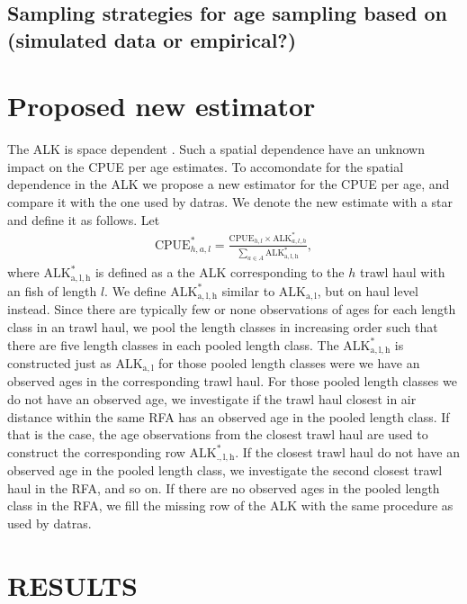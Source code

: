 \documentclass[a4paper 12pt]{article}
\numberwithin{equation}{section}
\begin{document}
\subsection{Sampling strategies for age sampling based on (simulated data or empirical?)}


\section{Proposed new estimator}
The ALK is space dependent \citep{berg2012spatial}. Such a spatial dependence have an unknown impact on the CPUE per age estimates. To accomondate for the spatial dependence in the ALK we propose a new estimator for the CPUE per age, and compare it with the one used by datras. We denote the new estimate with a star and define it as follows. Let
\begin{align}\label{cpueageNew}
\mathrm{CPUE}^*_{h,a,l} =  \displaystyle \frac{\mathrm{CPUE}_{h,l} \times \mathrm{ALK}_{a,l,h}^*}{\displaystyle \sum\limits_{a \in A} \mathrm{ALK_{a,l,h}^*}},
\end{align}
where $\mathrm{ALK_{a,l,h}^*}$ is defined as a the ALK corresponding to the $h$ trawl haul with an fish of length $l$. We define $\mathrm{ALK_{a,l,h}^*}$ similar to $\mathrm{ALK_{a,l}}$, but on haul level instead.  Since there are typically few or none observations of ages for each length class in an trawl haul, we pool the length classes in increasing order such that there are five length classes in each pooled length class. The $\mathrm{ALK_{a,l,h}^*}$ is constructed just as $\mathrm{ALK_{a,l}}$ for those pooled length classes were we have an observed ages in the corresponding trawl haul. For those pooled length classes we do not have an observed age, we investigate if the trawl haul closest in air distance within the same RFA has an observed age in the pooled length class. If that is the case, the age observations from the closest trawl haul are used to construct the corresponding row $\mathrm{ALK_{.,l,h}^*}$. If the closest trawl haul do not have an observed age in the pooled length class, we investigate the second closest trawl haul in the RFA, and so on. If there are no observed ages in the pooled length class in the RFA, we fill the missing row of the ALK with the same procedure as used by datras.
\clearpage
\section{RESULTS}
\end{document}
